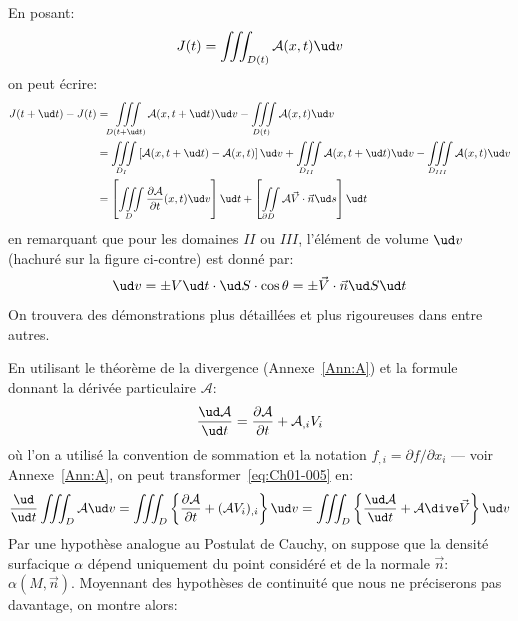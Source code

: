 \noindent En posant:
\begin{equation*}
J(t)=\iiint_{D(t)} \mathcal{A}(x,t) \ud v
\end{equation*} on peut écrire:
\begin{equation*}
    \begin{aligned}
        J(t+\ud t)-J(t) & =\iiint\limits_{D(t+\ud t)} \mathcal{A}(x,t+\ud t) \ud v-\iiint\limits_{D(t)} \mathcal{A}(x,t) \ud v\\
                        & =\iiint\limits_{D_I} \left[\mathcal{A}(x,t+\ud t)-\mathcal{A}(x,t)\right] \ud v+\iiint\limits_{D_{II}} \mathcal{A}(x,t+\ud t) \ud v-\iiint\limits_{D_{III}} \mathcal{A}(x,t) \ud v\\
                        & =\left[\iiint\limits_{D} \frac{\partial \mathcal{A}}{\partial t}(x,t) \ud v\right]\ud t+ \left[\iint\limits_{\partial D} \mathcal{A}\vec{V}\cdot\vec{n} \ud s\right]\ud t
    \end{aligned}
\end{equation*}
en remarquant que pour les domaines $II$ ou $III$, l'élément de volume $\ud v$ (hachuré sur la figure ci-contre) est donné par:
\begin{equation*}
    \ud v=\pm V \ud t \cdot \ud S \cdot \cos\theta = \pm \vec{V}\cdot\vec{n} \ud S \ud t
\end{equation*}
On trouvera des démonstrations plus détaillées et plus rigoureuses dans \cite{Germain-62,Germain-73,Mandel-66,Gontier-69} entre autres.

En utilisant le théorème de la divergence (Annexe~\ref{Ann:A}) et la formule donnant la dérivée particulaire $\mathcal{A}$:
\begin{equation*}
    \frac{\ud \mathcal{A}}{\ud t}=\frac{\partial \mathcal{A}}{\partial t}+\mathcal{A}_{,i}V_i
\end{equation*}
où l'on a utilisé la convention de sommation et la notation $f_{,i}=\partial f/\partial x_i$ --- voir Annexe~\ref{Ann:A}, on peut transformer~\eqref{eq:Ch01-005} en:
\begin{equation}
    \frac{\ud}{\ud t}\iiint_{D} \mathcal{A} \ud v=\iiint_{D}\left\{\frac{\partial\mathcal{A}}{\partial t}+(\mathcal{A}V_i)_{,i}\right\} \ud v=\iiint_{D} \left\{\frac{\ud\mathcal{A}}{\ud t}+\mathcal{A}\dive\vec{V}\right\} \ud v
    \label{eq:Ch01-006}
\end{equation}
Par une hypothèse analogue au Postulat de Cauchy, on suppose que la densité surfacique $\alpha$ dépend uniquement du point considéré et de la normale $\vec{n}$: $\alpha(M,\vec{n})$.
Moyennant des hypothèses de continuité que nous ne préciserons pas davantage, on montre alors:

